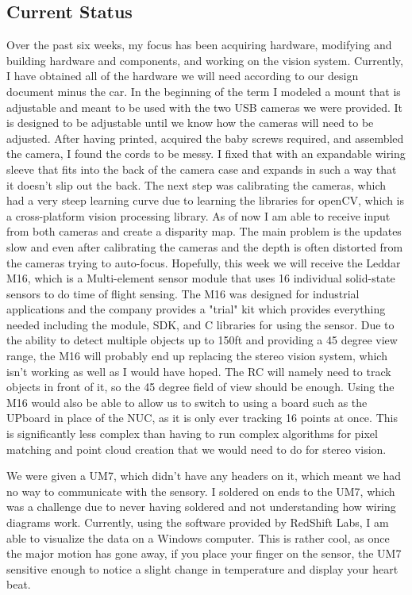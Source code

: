 \documentclass[compsoc,draftclsnofoot,onecolumn,10pt]{IEEEtran}
\begin{document}
	\subsection{Current Status}
		Over the past six weeks, my focus has been acquiring hardware, modifying and building hardware and components, and working on the vision system. 
		Currently, I have obtained all of the hardware we will need according to our design document minus the car. 
		In the beginning of the term I modeled a mount that is adjustable and meant to be used with the two USB cameras we were provided. 
		It is designed to be adjustable until we know how the cameras will need to be adjusted. 
		After having printed, acquired the baby screws required, and assembled the camera, I found the cords to be messy. 
		I fixed that with an expandable wiring sleeve that fits into the back of the camera case and expands in such a way that it doesn't slip out the back. 
		The next step was calibrating the cameras, which had a very steep learning curve due to learning the libraries for openCV, which is a cross-platform vision processing library. 
		As of now I am able to receive input from both cameras and create a disparity map. 
		The main problem is the updates slow and even after calibrating the cameras and the depth is often distorted from the cameras trying to auto-focus. 
		Hopefully, this week we will receive the Leddar M16, which is a Multi-element sensor module that uses 16 individual solid-state sensors to do time of flight sensing. 
		The M16 was designed for industrial applications and the company provides a "trial" kit which provides everything needed including the module, SDK, and C libraries for using the sensor.
		Due to the ability to detect multiple objects up to 150ft and providing a 45 degree view range, the M16 will probably end up replacing the stereo vision system, which isn't working as well as I would have hoped. 
		The RC will namely need to track objects in front of it, so the 45 degree field of view should be enough. 
		Using the M16 would also be able to allow us to switch to using a board such as the UPboard in place of the NUC, as it is only ever tracking 16 points at once. 
		This is significantly less complex than having to run complex algorithms for pixel matching and point cloud creation that we would need to do for stereo vision. 
		
		We were given a UM7, which didn't have any headers on it, which meant we had no way to communicate with the sensory. 
		I soldered on ends to the UM7, which was a challenge due to never having soldered and not understanding how wiring diagrams work.
		 Currently, using the software provided by RedShift Labs, I am able to visualize the data on a Windows computer. 
		This is rather cool, as once the major motion has gone away, if you place your finger on the sensor, the UM7 sensitive enough to notice a slight change in temperature and display your heart beat. 
		
\end{document}
